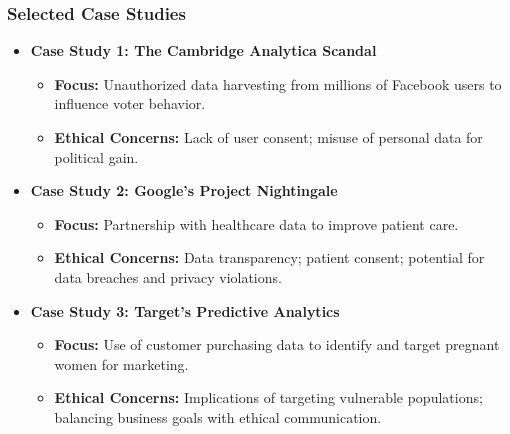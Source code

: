 \documentclass[aspectratio=169]{beamer}
\begin{document}
\begin{frame}[fragile]
    \frametitle{Selected Case Studies}

    \begin{itemize}
        \item \textbf{Case Study 1: The Cambridge Analytica Scandal}
            \begin{itemize}
                \item \textbf{Focus:} Unauthorized data harvesting from millions of Facebook users to influence voter behavior.
                \item \textbf{Ethical Concerns:} Lack of user consent; misuse of personal data for political gain.
            \end{itemize}
            
        \item \textbf{Case Study 2: Google's Project Nightingale}
            \begin{itemize}
                \item \textbf{Focus:} Partnership with healthcare data to improve patient care.
                \item \textbf{Ethical Concerns:} Data transparency; patient consent; potential for data breaches and privacy violations.
            \end{itemize}

        \item \textbf{Case Study 3: Target's Predictive Analytics}
            \begin{itemize}
                \item \textbf{Focus:} Use of customer purchasing data to identify and target pregnant women for marketing.
                \item \textbf{Ethical Concerns:} Implications of targeting vulnerable populations; balancing business goals with ethical communication.
            \end{itemize}
    \end{itemize}
\end{frame}
\end{document}
